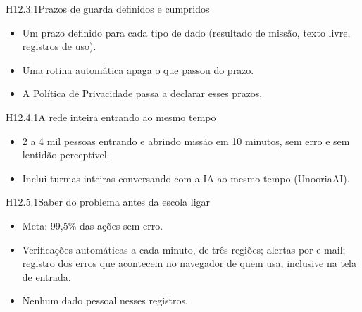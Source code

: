 
\begin{historia}{H12.3.1}{Prazos de guarda definidos e cumpridos}{\afazer}
\aceiteproposta
\begin{itemize}
  \item Um prazo definido para cada tipo de dado (resultado de missão, texto
    livre, registros de uso).
  \item Uma rotina automática apaga o que passou do prazo.
  \item A Política de Privacidade passa a declarar esses prazos.
\end{itemize}
\end{historia}


\begin{historia}{H12.4.1}{A rede inteira entrando ao mesmo tempo}{\parcial}
\aceite
\begin{itemize}
  \item 2 a 4 mil pessoas entrando e abrindo missão em 10 minutos, sem erro e
    sem lentidão perceptível.
  \item Inclui turmas inteiras conversando com a IA ao mesmo tempo (UnooriaAI).
\end{itemize}
\end{historia}


\begin{historia}{H12.5.1}{Saber do problema antes da escola ligar}{\parcial}
\aceite
\begin{itemize}
  \item Meta: 99,5\% das ações sem erro.
  \item Verificações automáticas a cada minuto, de três regiões; alertas por
    e-mail; registro dos erros que acontecem no navegador de quem usa,
    inclusive na tela de entrada.
  \item Nenhum dado pessoal nesses registros.
\end{itemize}
\end{historia}

